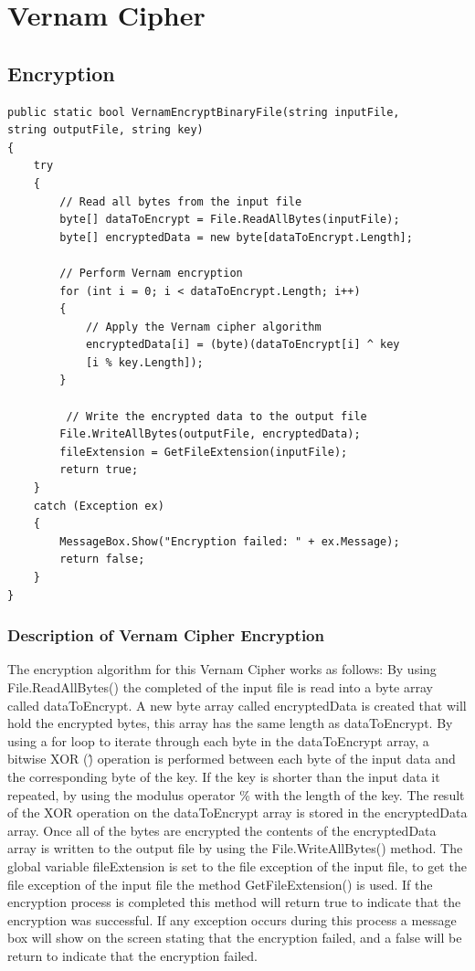 \documentclass[a4paper,oneside,11pt]{book}
\begin{document}
\chapter[Vernam Cipher]{Vernam Cipher}
\section{Encryption}
\begin{lstlisting}[language=Csh, caption={Code for Vernam Cipher Encryption}]
public static bool VernamEncryptBinaryFile(string inputFile, 
string outputFile, string key)
{
    try
    {
        // Read all bytes from the input file
        byte[] dataToEncrypt = File.ReadAllBytes(inputFile);
        byte[] encryptedData = new byte[dataToEncrypt.Length];
    
        // Perform Vernam encryption
        for (int i = 0; i < dataToEncrypt.Length; i++)
        {
            // Apply the Vernam cipher algorithm
            encryptedData[i] = (byte)(dataToEncrypt[i] ^ key
            [i % key.Length]);
        }
    
         // Write the encrypted data to the output file
        File.WriteAllBytes(outputFile, encryptedData);
        fileExtension = GetFileExtension(inputFile);
        return true;
    }
    catch (Exception ex)
    {
        MessageBox.Show("Encryption failed: " + ex.Message);
        return false;
    }
}
\end{lstlisting}

\subsection{Description of Vernam Cipher Encryption}

The encryption algorithm for this Vernam Cipher works as follows:
By using File.ReadAllBytes() the completed of the input file is read into a byte array called dataToEncrypt. A new byte array called encryptedData is created that will hold the encrypted bytes, this array has the same length as dataToEncrypt. By using a for loop to iterate through each byte in the dataToEncrypt array, a bitwise XOR (\^) operation is performed between each byte of the input data and the corresponding byte of the key. If the key is shorter than the input data it repeated, by using the modulus operator \% with the length of the key. The result of the XOR operation on the  dataToEncrypt array is stored in the encryptedData array. Once all of the bytes are encrypted the contents of the encryptedData array is written to the output file by using the File.WriteAllBytes() method. The global variable fileExtension is set to the file exception of the input file, to get the file exception of the input file the method GetFileExtension() is used. If the encryption process is completed this method will return true to indicate that the encryption was successful. If any exception occurs during this process a message box will show on the screen stating that the encryption failed, and a false will be return to indicate that the encryption failed.
\end{document}

